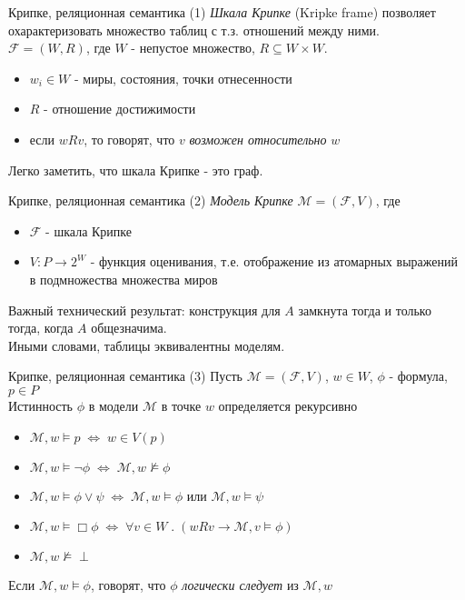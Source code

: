 \documentclass{beamer}
\begin{document}
\begin{frame}{Крипке, реляционная семантика (1)}
\textit{Шкала Крипке} (Kripke frame) позволяет охарактеризовать множество таблиц с т.з. отношений между ними.\\
\bigskip
$\mathcal{F} = (W, R)$, где $W$ - непустое множество, $R \subseteq W \times W$.\\
\bigskip
\begin{itemize}
  \item $w_i \in W$ - миры, состояния, точки отнесенности
  \item $R$ - отношение достижимости
  \item если $wRv$, то говорят, что $v$ \textit{возможен относительно} $w$
\end{itemize}
\bigskip
Легко заметить, что шкала Крипке - это граф.
\end{frame}

\begin{frame}{Крипке, реляционная семантика (2)}
\textit{Модель Крипке} $\mathcal{M} = (\mathcal{F}, V)$, где  
\bigskip
\begin{itemize}
  \item $\mathcal{F}$ - шкала Крипке
  \item $V : P \to 2^W$ - функция оценивания, т.е. отображение из атомарных выражений в подмножества множества миров
\end{itemize}
\bigskip
Важный технический результат: конструкция для $A$ замкнута тогда и только тогда, когда $A$ общезначима.\\
\bigskip
Иными словами, таблицы эквивалентны моделям.
\end{frame}

\begin{frame}{Крипке, реляционная семантика (3)}
Пусть $\mathcal{M} = (\mathcal{F}, V)$, $w \in W$, $\phi$ - формула, $p \in P$\\
\bigskip
Истинность $\phi$ в модели $\mathcal{M}$ в точке $w$ определяется рекурсивно\\
\bigskip
\begin{itemize}
  \item $\mathcal{M}, w \models p \; \Longleftrightarrow \; w \in V(p)$
  \item $\mathcal{M}, w \models \neg \phi \; \Longleftrightarrow \; \mathcal{M}, w \not\models \phi$
  \item $\mathcal{M}, w \models \phi \vee \psi \; \Longleftrightarrow \; \mathcal{M}, w \models \phi$ или $\mathcal{M}, w \models \psi$
  \item $\mathcal{M}, w \models \Box \phi \; \Longleftrightarrow \; \forall v \in W \; . \; (w R v \to \mathcal{M}, v \models \phi)$
  \item $\mathcal{M}, w \not\models \perp$
\end{itemize}
\bigskip
Если $\mathcal{M}, w \models \phi$, говорят, что $\phi$ \textit{логически следует} из $\mathcal{M}, w$
\end{frame}
\end{document}

